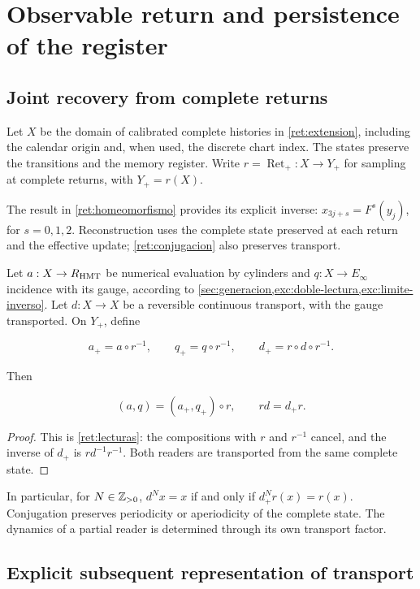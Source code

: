 \section{Observable return and persistence of the register}
\label{nuclear:9}
\subsection{Joint recovery from complete returns}

Let \(X\) be the domain of calibrated complete histories in \cref{ret:extension}, including the calendar origin and, when used, the discrete chart index. The states preserve the transitions and the memory register. Write \(r=\operatorname{Ret}_+:X\to Y_+\) for sampling at complete returns, with \(Y_+=r(X)\).

The result in \cref{ret:homeomorfismo} provides its explicit inverse: \(x_{3j+s}=F^s(y_j)\), for \(s=0,1,2\). Reconstruction uses the complete state preserved at each return and the effective update; \eqref{ret:conjugacion} also preserves transport.

Let \(a:X\to R_{\rm HMT}\) be numerical evaluation by cylinders and \(q:X\to E_\infty\) incidence with its gauge, according to \cref{sec:generacion,exc:doble-lectura,exc:limite-inverso}. Let \(d:X\to X\) be a reversible continuous transport, with the gauge transported. On \(Y_+\), define

\[
a_+=a\circ r^{-1},\qquad q_+=q\circ r^{-1},\qquad d_+=r\circ d\circ r^{-1}.
\]

Then

\begin{equation}
\boxed{(a,q)=(a_+,q_+)\circ r,\qquad rd=d_+r.}
\label{nuc09:lecturas}
\end{equation}

\begin{proof}
This is \cref{ret:lecturas}: the compositions with \(r\) and \(r^{-1}\) cancel, and the inverse of \(d_+\) is \(rd^{-1}r^{-1}\). Both readers are transported from the same complete state.
\end{proof}

In particular, for \(N\in\mathbb Z_{>0}\), \(d^Nx=x\) if and only if \(d_+^Nr(x)=r(x)\). Conjugation preserves periodicity or aperiodicity of the complete state. The dynamics of a partial reader is determined through its own transport factor.

\subsection{Explicit subsequent representation of transport}

